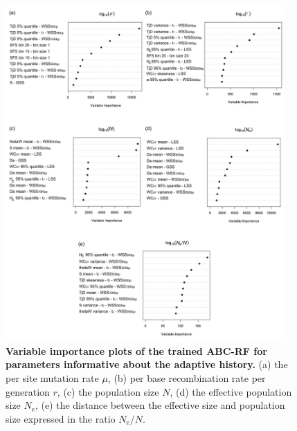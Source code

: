 \documentclass[a4paper, 12pt]{article}
\begin{document}
\begin{figure}[ht]
  \centering
  \includegraphics[width=0.95\textwidth]{Figures/FigureS5_varplot_demography.pdf}
  \small\caption{\textbf{Variable importance plots of the trained ABC-RF for parameters informative about the adaptive history.} (a) the per site mutation rate $\mu$, (b) per base recombination rate per generation $r$, (c) the population size $N$, (d) the effective population size $N_{\mathrm{e}}$, (e) the distance between the effective size and population size expressed in the ratio $N_{\mathrm{e}}/N$.}
  \label{fig:supple_pods_varplots_demo}
\end{figure}
\end{document}
